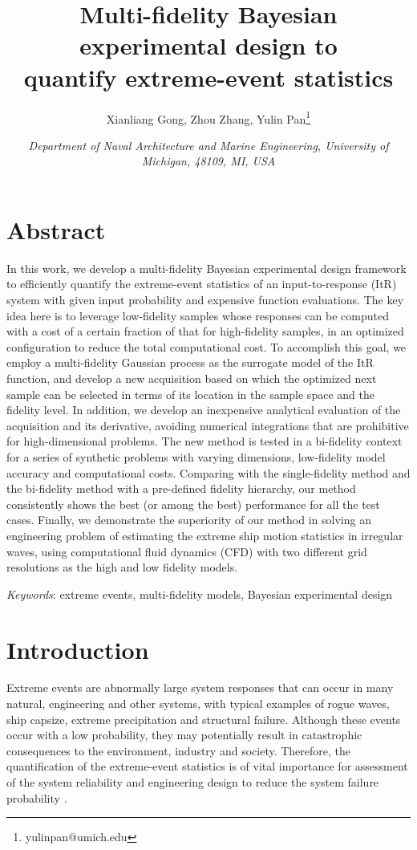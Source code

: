 \documentclass[11pt]{article}
\title{Multi-fidelity Bayesian experimental design to \\ quantify extreme-event statistics}
\author{Xianliang Gong, Zhou Zhang, Yulin Pan\footnote{yulinpan@umich.edu}}
\date{\small \textit{Department of Naval Architecture and Marine Engineering, University of Michigan, 48109, MI, USA}}
\begin{document}
\maketitle
\section*{Abstract}
In this work, we develop a multi-fidelity Bayesian experimental design framework to efficiently quantify the extreme-event statistics of an input-to-response (ItR) system with given input probability and expensive function evaluations. The key idea here is to leverage low-fidelity samples whose responses can be computed with a cost of a certain fraction of that for high-fidelity samples, in an optimized configuration to reduce the total computational cost. To accomplish this goal, we employ a multi-fidelity Gaussian process as the surrogate model of the ItR function, and develop a new acquisition based on which the optimized next sample can be selected in terms of its location in the sample space and the fidelity level. In addition, we develop an inexpensive analytical evaluation of the acquisition and its derivative, avoiding numerical integrations that are prohibitive for high-dimensional problems. The new method is tested in a bi-fidelity context for a series of synthetic problems with varying dimensions, low-fidelity model accuracy and computational costs. Comparing with the single-fidelity method and the bi-fidelity method with a pre-defined fidelity hierarchy, our method consistently shows the best (or among the best) performance for all the test cases. Finally, we demonstrate the superiority of our method in solving an engineering problem of estimating the extreme ship motion statistics in irregular waves, using computational fluid dynamics (CFD) with two different grid resolutions as the high and low fidelity models. 

\vspace{0.2cm}

\noindent \textit{Keywords}: extreme events, multi-fidelity models, Bayesian experimental design


\section{Introduction}
Extreme events are abnormally large system responses that can occur in many natural, engineering and other systems, with typical examples of rogue waves, ship capsize, extreme precipitation and structural failure. Although these events occur with a low probability, they may potentially result in catastrophic consequences to the environment, industry and society. Therefore, the quantification of the extreme-event statistics is of vital importance for assessment of the system reliability and engineering design to reduce the system failure probability \cite{farazmand2019extreme,ghil2011extreme,rahmstorf2011increase}.
\end{document}

